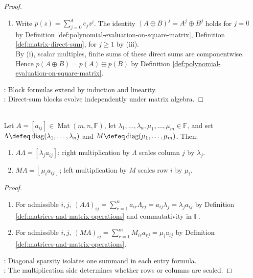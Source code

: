 \begin{proposition}
\begin{proof}
\begin{enumerate}[label=(\roman*)]
\item Write $p(z)=\sum\limits_{j=0}^{d}c_jz^j$. The identity $(A\oplus B)^j=A^j\oplus B^j$ holds for $j=0$ by Definition \ref{def:polynomial-evaluation-on-square-matrix}, Definition \ref{def:matrix-direct-sum}, for $j\geq1$ by (iii).\\
By (i), scalar multiples, finite sums of these direct sums are componentwise. Hence $p(A\oplus B)=p(A)\oplus p(B)$ by Definition \ref{def:polynomial-evaluation-on-square-matrix}.
\end{enumerate}
: Block formulas extend by induction and linearity.\\
: Direct-sum blocks evolve independently under matrix algebra.
\end{proof}
\end{proposition}

\begin{proposition} \label{prop:diagonal-multiplication-scales-rows-columns} \\
Let $A=[a_{ij}]\in\operatorname{Mat}(m,n,\mathbb{F})$, let $\lambda_1,\ldots,\lambda_n,\mu_1,\ldots,\mu_m\in\mathbb{F}$, and set $\Lambda\defeq\operatorname{diag}(\lambda_1,\ldots,\lambda_n)$ and $M\defeq\operatorname{diag}(\mu_1,\ldots,\mu_m)$. Then:
\begin{enumerate}[label=(\roman*)]
\setlength{\itemsep}{0pt}
\item $A\Lambda=[\lambda_ja_{ij}]$; right multiplication by $\Lambda$ scales column $j$ by $\lambda_j$.
\item $MA=[\mu_ia_{ij}]$; left multiplication by $M$ scales row $i$ by $\mu_i$.
\end{enumerate}
\begin{proof}
\begin{enumerate}[label=(\roman*)]
\setlength{\itemsep}{0pt}
\item For admissible $i,j$, $(A\Lambda)_{ij}=\sum\limits_{r=1}^{n}a_{ir}\Lambda_{rj}=a_{ij}\lambda_j=\lambda_ja_{ij}$ by Definition \ref{def:matrices-and-matrix-operations} and commutativity in $\mathbb{F}$.
\item For admissible $i,j$, $(MA)_{ij}=\sum\limits_{r=1}^{m}M_{ir}a_{rj}=\mu_ia_{ij}$ by Definition \ref{def:matrices-and-matrix-operations}.
\end{enumerate}
: Diagonal sparsity isolates one summand in each entry formula.\\
: The multiplication side determines whether rows or columns are scaled.
\end{proof}
\end{proposition}

